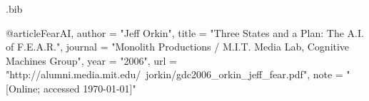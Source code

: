 \begin{filecontents*}{\jobname.bib}

@article{FearAI,
	author	= "Jeff Orkin",
	title		= "Three States and a Plan: The A.I. of F.E.A.R.",
	journal	= "Monolith Productions / M.I.T. Media Lab, Cognitive Machines Group",
	year		= "2006",
	url 		= "http://alumni.media.mit.edu/~jorkin/gdc2006\_orkin\_jeff\_fear.pdf",
	note		= "[Online; accessed \today]"
}

\end{filecontents*}

